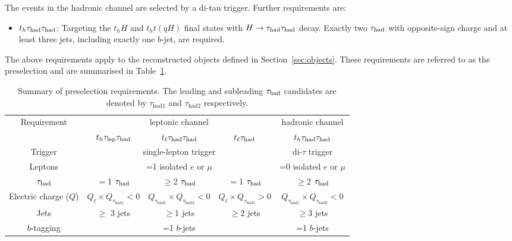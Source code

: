 The events in the hadronic channel are selected by a di-tau trigger. Further requirements are:
\begin{itemize}
\item $t_h\tau_{\mathrm{had}} \tau_{\mathrm{had}}$: Targeting the $t_hH$ and $t_ht(qH)$ final states with $H\to\tau_{\mathrm{had}} \tau_{\mathrm{had}}$ decay. Exactly two $\tau_{\mathrm{had}}$ with opposite-sign charge and at least three jets, including exactly one $b$-jet, are required.
\end{itemize}

The above requirements apply to the reconstructed objects defined in Section~\ref{sec:objects}.
These requirements are referred to as the preselection and are summarised in Table~\ref{tab:preselection}. 

\begin{table*}[t!]
\caption{\small{Summary of preselection requirements. 
The leading and subleading $\tau_{\mathrm{had}}$ candidates are denoted by $\tau_{\mathrm{had1}}$ and $\tau_{\mathrm{had2}}$ respectively.}}
\begin{center}
\begin{tabular}{c|ccc|c}
\toprule\toprule
\multirow{2}{*}{Requirement} &  \multicolumn{3}{c|}{leptonic channel}  & \multicolumn{1}{c}{hadronic channel} \\ 
& $t_h\tau_{\mathrm{lep}} \tau_{\mathrm{had}}$ & $t_{\ell}\tau_{\mathrm{had}} \tau_{\mathrm{had}}$ &  $t_{\ell}\tau_{\mathrm{had}}$ & $t_h\tau_{\mathrm{had}} \tau_{\mathrm{had}}$\\
\midrule
Trigger & \multicolumn{3}{c|}{single-lepton trigger} & di-$\tau$ trigger  \\
Leptons  & \multicolumn{3}{c|}{=1 isolated $e$ or $\mu$}  & =0 isolated $e$ or $\mu$ \\
$\tau_{\mathrm{had}}$  & $=$1 $\tau_{\mathrm{had}}$ & $\geq$2 $\tau_{\mathrm{had}}$ & $=$1 $\tau_{\mathrm{had}}$ & $\geq$2 $\tau_{\mathrm{had}}$ \\
Electric charge ($Q$) & $Q_\ell \times Q_{\tau_{\mathrm{had1}}} < 0$ & $Q_{\tau_{\mathrm{had1}}} \times Q_{\tau_{\mathrm{had2}}} < 0$ & $Q_\ell \times Q_{\tau_{\mathrm{had1}}} > 0$ & $Q_{\tau_{\mathrm{had1}}} \times Q_{\tau_{\mathrm{had2}}} < 0$ \\
Jets  &   $\geq$ 3 jets & $\geq$1 jets & $\geq$2 jets & $\geq$3 jets \\
$b$-tagging & \multicolumn{3}{c|}{=1 $b$-jets} & =1 $b$-jets\\
\bottomrule\bottomrule
\end{tabular}
\label{tab:preselection}
\end{center}
\end{table*}
